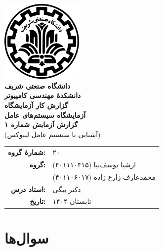 \documentclass[12pt]{article}
\newcommand{\persianordinal}[1]{%
	\ifcase#1
	\or اول%
	\or دوم%
	\or سوم%
	\or چهارم%
	\or پنجم%
	\or ششم%
	\or هفتم%
	\or هشتم%
	\or نهم%
	\or دهم%
	\or یازدهم%
	\or دوازدهم%
	\or سیزدهم%
	\or چهاردهم%
	\or پانزدهم%
	\or شانزدهم%
	\or هفدهم%
	\or هجدهم%
	\or نوزدهم%
	\or بیستم%
	\else #1\fi
}
\newcommand{\persianordinalpage}{\persianfont\persianordinal{\value{page}}}
\begin{document}
	
	\begin{titlepage}
		\centering
		\vspace*{1cm}
		\includegraphics[width=4cm]{sharif.png}\\[1.5cm]
		{\Large\textbf{دانشگاه صنعتی شریف}}\\[0.5cm]
		{\large\textbf{دانشکدهٔ مهندسی کامپیوتر}}\\[1.5cm]
		{\Huge\textbf{گزارش کار آزمایشگاه}}\\[0.5cm]
		{\LARGE\textbf{آزمایشگاه سیستم‌های عامل}}\\[2cm]
		
		\textbf{گزارش آزمایش شماره ۱}\\
		(آشنایی با سیستم عامل لینوکس)
		
		\vfill
		\begin{tabular}{rl}
			\textbf{شمارهٔ گروه:} & ۲۰ \\
			\textbf{گروه:} &
			ارشیا یوسف‌نیا (۴۰۱۱۱۰۴۱۵) \\
			& محمدعارف زارع زاده (۴۰۱۱۰۶۰۱۷) \\
			\textbf{استاد درس:} & دکتر بیگی \\
			\textbf{تاریخ:} & تابستان ۱۴۰۴ \\
		\end{tabular}
	\end{titlepage}
	
	\clearpage
	\setcounter{page}{1}
	\renewcommand{\thepage}{\persianordinalpage}
	
	\tableofcontents
	\clearpage
	\listoffigures
	\clearpage
	\listoftables
	
	\clearpage
	\setcounter{page}{1}
	\renewcommand{\thepage}{\persianfont\arabic{page}}
	
	
	\section{سوال‌ها}
	
\end{document}

